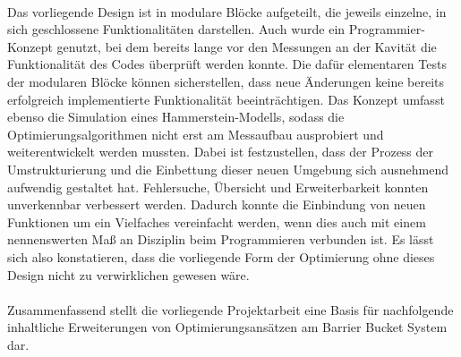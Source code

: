 \documentclass[../Report.tex]{subfiles}
\begin{document}
\\ 
Das vorliegende Design ist in modulare Blöcke aufgeteilt, die jeweils einzelne, in sich geschlossene Funktionalitäten darstellen. Auch wurde ein Programmier-Konzept genutzt, bei dem bereits lange vor den Messungen an der Kavität die Funktionalität des Codes überprüft werden konnte. Die dafür elementaren Tests der modularen Blöcke können sicherstellen, dass neue Änderungen keine bereits erfolgreich implementierte Funktionalität beeinträchtigen.
Das Konzept umfasst ebenso die Simulation eines Hammerstein-Modells, sodass die Optimierungsalgorithmen nicht erst am Messaufbau ausprobiert und weiterentwickelt werden mussten.
Dabei ist festzustellen, dass der Prozess der Umstrukturierung und die Einbettung dieser neuen Umgebung sich ausnehmend aufwendig gestaltet hat. Fehlersuche, Übersicht und Erweiterbarkeit konnten unverkennbar verbessert werden. Dadurch konnte die Einbindung von neuen Funktionen um ein Vielfaches vereinfacht werden, wenn dies auch mit einem nennenswerten Maß an Disziplin beim Programmieren verbunden ist. Es lässt sich also konstatieren, dass die vorliegende Form der Optimierung ohne dieses Design nicht zu verwirklichen gewesen wäre.
\\
\\
Zusammenfassend stellt die vorliegende Projektarbeit eine Basis für nachfolgende inhaltliche Erweiterungen von Optimierungsansätzen am Barrier Bucket System dar.
\end{document}
